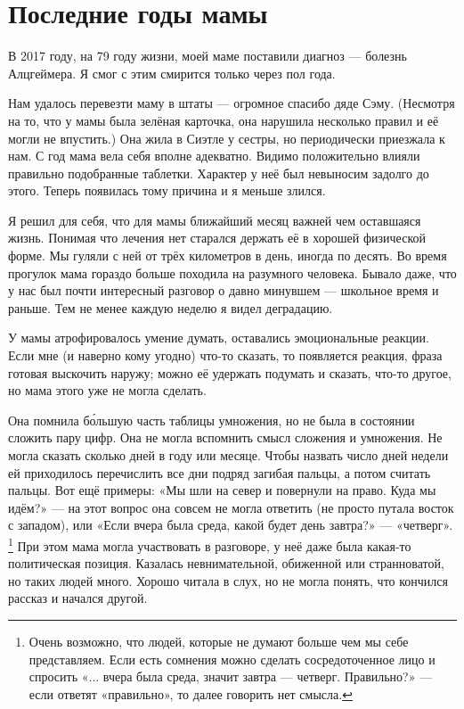 \section*{Последние годы мамы}
В 2017 году, на 79 году жизни, моей маме поставили диагноз --- болезнь Алцгеймера.
Я смог с этим смирится только через пол года.

Нам удалось перевезти маму в штаты --- огромное спасибо дяде Сэму.
(Несмотря на то, что у мамы была зелёная карточка, она нарушила несколько правил и её могли не впустить.)
Она жила в Сиэтле у сестры, но периодически приезжала к нам.
С год мама вела себя вполне адекватно.
Видимо положительно влияли правильно подобранные таблетки.
Характер у неё был невыносим задолго до этого.
Теперь появилась тому причина и я меньше злился.

Я решил для себя, что для мамы ближайший месяц важней чем оставшаяся жизнь.
Понимая что лечения нет старался держать её в хорошей физической форме.
Мы гуляли с ней от трёх километров в день, иногда по десять.
Во время прогулок мама гораздо больше походила на разумного человека. 
Бывало даже, что у нас был почти интересный разговор о давно минувшем --- школьное время и раньше.
Тем не менее каждую неделю я видел деградацию.

У мамы атрофировалось умение думать, оставались эмоциональные реакции.
Если мне (и наверно кому угодно) что-то сказать, то появляется реакция, фраза готовая выскочить наружу; можно её удержать подумать и сказать, что-то другое, но мама этого уже не могла сделать.

Она помнила б\'{о}льшую часть таблицы умножения, но не была в состоянии сложить пару цифр.
Она не могла вспомнить смысл сложения и умножения.
Не могла сказать сколько дней в году или месяце.
Чтобы назвать число дней недели ей приходилось перечислить все дни подряд загибая пальцы,
а потом считать пальцы.
Вот ещё примеры: «Мы шли на север и повернули на право. Куда мы идём?» --- на этот вопрос она совсем не могла ответить (не просто путала восток с западом),
или «Если вчера была среда, какой будет день завтра?» --- «четверг».%
\footnote{Очень возможно, что людей, которые не думают больше чем мы себе представляем.
Если есть сомнения можно сделать сосредоточенное лицо и спросить «... вчера была среда, значит завтра --- четверг. Правильно?» --- если ответят «правильно», то далее говорить нет смысла.}
При этом мама могла участвовать в разговоре, у неё даже была какая-то политическая позиция.
Казалась невнимательной, обиженной или странноватой, но таких людей много.
Хорошо читала в слух, но не могла понять, что кончился рассказ и начался другой.

